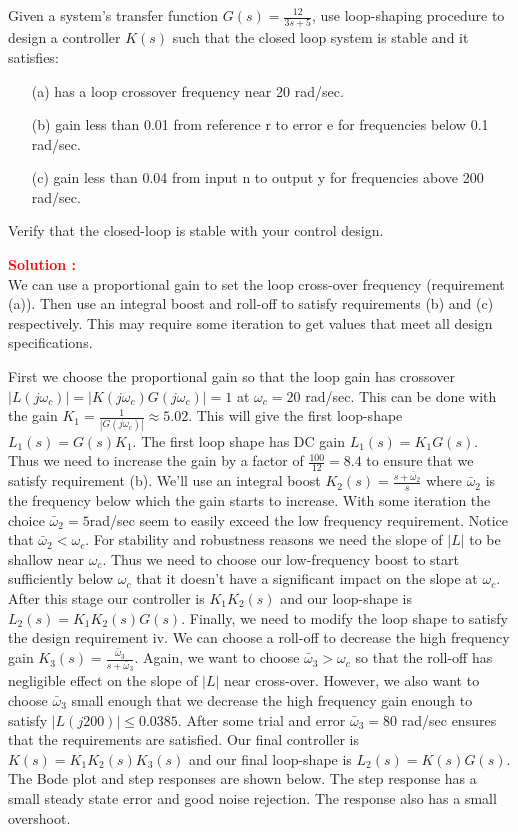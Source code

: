 \documentclass[12pt]{article}
\begin{document}
Given a system's transfer function $G(s) =\frac{12}{3s + 5} $, use loop-shaping procedure to design a controller $K(s)$ such that the closed loop system is stable and it satisfies:
\begin{itemize}
    \item [(a)] has a loop crossover frequency near 20 rad/sec.
    \item [(b)] gain less than 0.01 from reference r to error e for frequencies below 0.1 rad/sec.
    \item [(c)] gain less than 0.04 from input n to output y for frequencies above 200 rad/sec. 
\end{itemize}
Verify that the closed-loop is stable with your control design.

\textbf{\textcolor{red}{Solution :}} \\
We can use a proportional gain to set the loop cross-over frequency (requirement (a)). Then use an integral boost and roll-off to satisfy requirements (b) and (c) respectively. This may require some iteration to get values that meet all design specifications.

First we choose the proportional gain so that the loop gain has crossover $|L(j\omega_c)| =|K(j \omega_c) G(j \omega_c)| = 1$ at $\omega_c = 20$ rad/sec. This can be done with the gain $K_1 = \frac{1}{|G(j\omega_c)|} \approx 5.02$. This will give the first loop-shape $L_1(s) = G(s)K_1$. The first loop shape has DC gain $L_1(s) = K_1 G(s)$. Thus we need to increase the gain by a factor of $\frac{100}{12} = 8.4$ to ensure that we satisfy requirement (b). We'll use an integral boost 
$K_2(s) =\frac{s+\bar{\omega}_2}{s}$ where $\bar{\omega}_2$ is the frequency below which the gain starts to increase. With some iteration the choice $\bar{\omega}_2=5$rad/sec seem to easily exceed the low frequency requirement. Notice that $\bar{\omega}_2 < \omega_c$. For stability and robustness reasons we need the slope
of $|L|$ to be shallow near $\omega_c$. Thus we need to choose our low-frequency boost to start
sufficiently below $\omega_c$ that it doesn't have a significant impact on the slope at $\omega_c$. After
this stage our controller is $K_1 K_2(s)$ and our loop-shape is $L_2(s) = K_1 K_2(s)G(s)$.
Finally, we need to modify the loop shape to satisfy the design requirement iv. We can
choose a roll-off to decrease the high frequency gain $K_3(s) =\frac{\bar{\omega}_3}{s+\bar{\omega}_3}$. Again, we want to choose $\bar{\omega}_3 > \omega_c$ so that the roll-off has negligible effect on the slope of $|L|$ near cross-over. However, we also want to choose $\bar{\omega}_3$ small enough that we decrease the high frequency gain enough to satisfy $|L(j200)| \leq  0.0385$. After some trial and error $\bar{\omega}_3= 80$ rad/sec ensures that the requirements are satisfied. Our final controller is
$K(s) = K_1K_2(s)K_3(s)$ and our final loop-shape is $L_2(s) = K(s)G(s)$. The Bode plot and step responses are shown below. The step response has a small steady state error and good noise rejection. The response also has a small overshoot.
\end{document}
